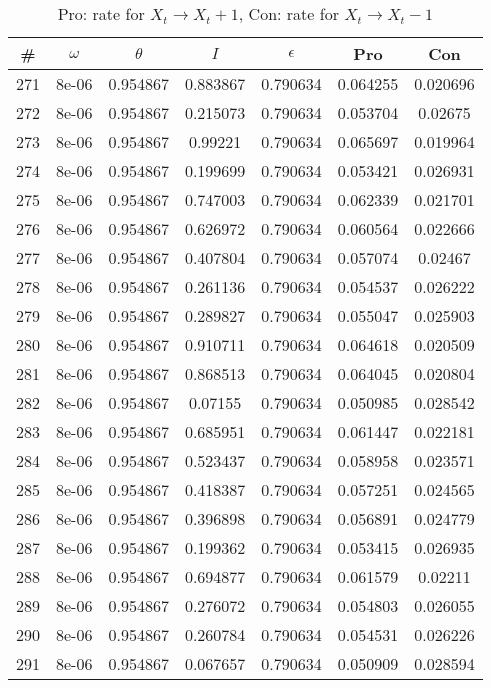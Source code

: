 \newpage
\begin{table}
\caption{Pro: rate for $X_t \rightarrow X_t + 1$, Con: rate for $X_t \rightarrow X_t - 1$}
\begin{tabular*}{\linewidth}{c|c|c|c|c|c|c}
\# & $\omega$ & $\theta$ & $I$ & $\epsilon$ & Pro & Con \\
\hline
271 & 8e-06 & 0.954867 & 0.883867 & 0.790634 & 0.064255 & 0.020696\\
272 & 8e-06 & 0.954867 & 0.215073 & 0.790634 & 0.053704 & 0.02675\\
273 & 8e-06 & 0.954867 & 0.99221 & 0.790634 & 0.065697 & 0.019964\\
274 & 8e-06 & 0.954867 & 0.199699 & 0.790634 & 0.053421 & 0.026931\\
275 & 8e-06 & 0.954867 & 0.747003 & 0.790634 & 0.062339 & 0.021701\\
276 & 8e-06 & 0.954867 & 0.626972 & 0.790634 & 0.060564 & 0.022666\\
277 & 8e-06 & 0.954867 & 0.407804 & 0.790634 & 0.057074 & 0.02467\\
278 & 8e-06 & 0.954867 & 0.261136 & 0.790634 & 0.054537 & 0.026222\\
279 & 8e-06 & 0.954867 & 0.289827 & 0.790634 & 0.055047 & 0.025903\\
280 & 8e-06 & 0.954867 & 0.910711 & 0.790634 & 0.064618 & 0.020509\\
281 & 8e-06 & 0.954867 & 0.868513 & 0.790634 & 0.064045 & 0.020804\\
282 & 8e-06 & 0.954867 & 0.07155 & 0.790634 & 0.050985 & 0.028542\\
283 & 8e-06 & 0.954867 & 0.685951 & 0.790634 & 0.061447 & 0.022181\\
284 & 8e-06 & 0.954867 & 0.523437 & 0.790634 & 0.058958 & 0.023571\\
285 & 8e-06 & 0.954867 & 0.418387 & 0.790634 & 0.057251 & 0.024565\\
286 & 8e-06 & 0.954867 & 0.396898 & 0.790634 & 0.056891 & 0.024779\\
287 & 8e-06 & 0.954867 & 0.199362 & 0.790634 & 0.053415 & 0.026935\\
288 & 8e-06 & 0.954867 & 0.694877 & 0.790634 & 0.061579 & 0.02211\\
289 & 8e-06 & 0.954867 & 0.276072 & 0.790634 & 0.054803 & 0.026055\\
290 & 8e-06 & 0.954867 & 0.260784 & 0.790634 & 0.054531 & 0.026226\\
291 & 8e-06 & 0.954867 & 0.067657 & 0.790634 & 0.050909 & 0.028594\\

\end{tabular*}
\end{table}
